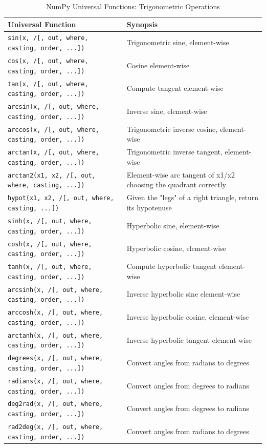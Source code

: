 \documentclass[a4paper,11pt]{book}
\begin{document}
\begin{appendices}
\begin{table}
\caption{NumPy Universal Functions: Trigonometric Operations}
\centering
\begin{tabular}{lp{13cm}}
\toprule \toprule 
Universal Function & Synopsis \\
\midrule
\texttt{sin(x, /[, out, where, casting, order, ...])} & Trigonometric sine, element-wise\\
\texttt{cos(x, /[, out, where, casting, order, ...])} & Cosine element-wise\\
\texttt{tan(x, /[, out, where, casting, order, ...])} & Compute tangent element-wise\\
\texttt{arcsin(x, /[, out, where, casting, order, ...])} & Inverse sine, element-wise\\
\texttt{arccos(x, /[, out, where, casting, order, ...])} & Trigonometric inverse cosine, element-wise\\
\texttt{arctan(x, /[, out, where, casting, order, ...])} & Trigonometric inverse tangent, element-wise\\
\texttt{arctan2(x1, x2, /[, out, where, casting, ...])} & Element-wise arc tangent of x1/x2 choosing the quadrant correctly\\
\texttt{hypot(x1, x2, /[, out, where, casting, ...])} & Given the "legs" of a right triangle, return its hypotenuse\\
\texttt{sinh(x, /[, out, where, casting, order, ...])} & Hyperbolic sine, element-wise\\
\texttt{cosh(x, /[, out, where, casting, order, ...])} & Hyperbolic cosine, element-wise\\
\texttt{tanh(x, /[, out, where, casting, order, ...])} & Compute hyperbolic tangent element-wise\\
\texttt{arcsinh(x, /[, out, where, casting, order, ...])} & Inverse hyperbolic sine element-wise\\
\texttt{arccosh(x, /[, out, where, casting, order, ...])} & Inverse hyperbolic cosine, element-wise\\
\texttt{arctanh(x, /[, out, where, casting, order, ...])} & Inverse hyperbolic tangent element-wise\\
\texttt{degrees(x, /[, out, where, casting, order, ...])} & Convert angles from radians to degrees\\
\texttt{radians(x, /[, out, where, casting, order, ...])} & Convert angles from degrees to radians\\
\texttt{deg2rad(x, /[, out, where, casting, order, ...])} & Convert angles from degrees to radians\\
\texttt{rad2deg(x, /[, out, where, casting, order, ...])} & Convert angles from radians to degrees\\
\bottomrule
\end{tabular}
\end{table}
\clearpage


\end{appendices}
\end{document}
